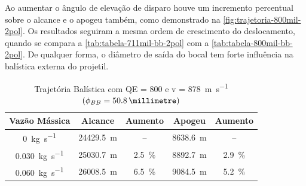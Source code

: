 Ao aumentar o ângulo de elevação de disparo houve um incremento percentual sobre o alcance e o apogeu também, como demonstrado na \autoref{fig:trajetoria-800mil-2pol}. Os resultados seguiram a mesma ordem de crescimento do deslocamento, quando se compara a \autoref{tab:tabela-711mil-bb-2pol} com a \autoref{tab:tabela-800mil-bb-2pol}. De qualquer forma, o diâmetro de saída do bocal tem forte influência na balística externa do projetil.

\begin{table}[ht]
\centering
\caption[Trajetória Balística com QE = \qty{800}{\milliradian} e v = \qty{878}{\metre\per\second} $\left(\phi_{BB} = \qty{50,8}{\millimetre}\right)$]{Trajetória Balística com QE = \qty{800}{\milliradian} e v = \qty[per-mode =symbol]{878}{\metre\per\second} $\left(\phi_{BB} = \qty{50,8}{\millimetre}\right)$}
\vspace{0.5cm}
\begin{tabular}{c|c|c|c|c}
Vazão Mássica & Alcance & Aumento & Apogeu & Aumento \\
\hline
\qty{0}{\kilogram\per\second} & \qty{24429,5}{\metre} & -- & \qty{8638,6}{\metre} & -- \\ 
\qty{0,030}{\kilogram\per\second} & \qty{25030,7}{\metre} & \qty{2,5}{\percent} & \qty{8892,7}{\metre} & \qty{2,9}{\percent} \\
\qty{0,060}{\kilogram\per\second} & \qty{26008,5}{\metre} & \qty{6,5}{\percent} & \qty{9084,5}{\metre} & \qty{5,2}{\percent}
\end{tabular}
\label{tab:tabela-800mil-bb-2pol}
\end{table}